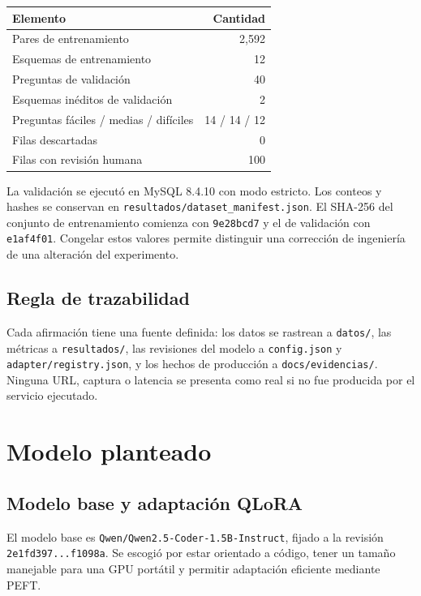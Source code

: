 \documentclass[11pt,letterpaper]{article}
\newcommand{\code}[1]{\texttt{#1}}
\begin{document}
\begin{center}
\begin{tabular}{@{}lr@{}}
\toprule
\textbf{Elemento} & \textbf{Cantidad}\\
\midrule
Pares de entrenamiento & 2,592\\
Esquemas de entrenamiento & 12\\
Preguntas de validación & 40\\
Esquemas inéditos de validación & 2\\
Preguntas fáciles / medias / difíciles & 14 / 14 / 12\\
Filas descartadas & 0\\
Filas con revisión humana & 100\\
\bottomrule
\end{tabular}
\end{center}

La validación se ejecutó en MySQL 8.4.10 con modo estricto. Los conteos y hashes se conservan en
\code{resultados/dataset\_manifest.json}. El SHA-256 del conjunto de entrenamiento comienza con
\code{9e28bcd7} y el de validación con \code{e1af4f01}. Congelar estos valores permite distinguir
una corrección de ingeniería de una alteración del experimento.

\subsection{Regla de trazabilidad}

Cada afirmación tiene una fuente definida: los datos se rastrean a \code{datos/}, las métricas a
\code{resultados/}, las revisiones del modelo a \code{config.json} y \code{adapter/registry.json}, y
los hechos de producción a \code{docs/evidencias/}. Ninguna URL, captura o latencia se presenta como
real si no fue producida por el servicio ejecutado.

\section{Modelo planteado}

\subsection{Modelo base y adaptación QLoRA}

El modelo base es \code{Qwen/Qwen2.5-Coder-1.5B-Instruct}, fijado a la revisión
\code{2e1fd397...f1098a}. Se escogió por estar orientado a código, tener un tamaño manejable para una
GPU portátil y permitir adaptación eficiente mediante PEFT.
\end{document}
